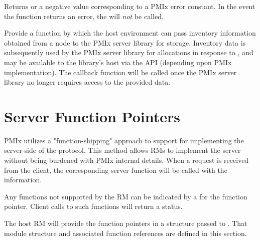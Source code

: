 \begin{arglist}
\end{arglist}

Returns  or a negative value corresponding to a PMIx error constant. In the event the function returns an error, the  will \textit{not} be called.

\descr

Provide a function by which the host environment can pass inventory information obtained from a node to the \ac{PMIx} server library for storage. Inventory data is subsequently used by the \ac{PMIx} server library for allocations in response to , and may be available to the library's host via the  \ac{API} (depending upon \ac{PMIx} implementation). The  callback function will be called once the \ac{PMIx} server library no longer requires access to the provided data.

\section{Server Function Pointers}

\ac{PMIx} utilizes a "function-shipping" approach to support for implementing the server-side of the protocol. This method allows \acp{RM} to implement the server without being burdened with \ac{PMIx} internal details. When a request is received from the client, the corresponding server function will be called with the information.

Any functions not supported by the \ac{RM} can be indicated by a  for the function pointer. Client calls to such functions will return a  status.

The host \ac{RM} will provide the function pointers in a  structure passed to .
That module structure and associated function references are defined in this section.

